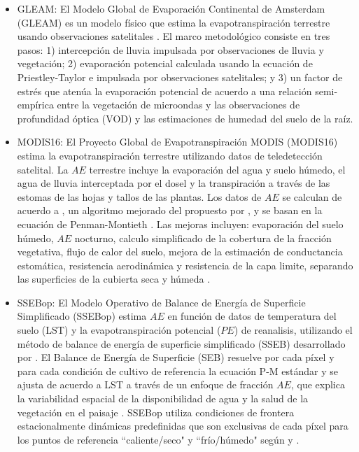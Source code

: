 \documentclass[12pt]{article}
\begin{document}
\begin{itemize}
	\item GLEAM: El Modelo Global de Evaporación Continental de Amsterdam (GLEAM) es un modelo físico que estima la evapotranspiración terrestre usando observaciones satelitales \citep{Martens2017}. El marco metodológico consiste en tres pasos: 1) intercepción de lluvia impulsada por observaciones de lluvia y vegetación; 2) evaporación potencial calculada usando la ecuación de Priestley-Taylor \citep[P-T;][]{priestley1972assessment} e impulsada por observaciones satelitales; y 3) un factor de estrés que atenúa la evaporación potencial de acuerdo a una relación semi-empírica entre la vegetación de microondas y las observaciones de profundidad óptica (VOD) y las estimaciones de humedad del suelo de la raíz. %
	
	\item MODIS16: El Proyecto Global de Evapotranspiración MODIS (MODIS16) estima la evapotranspiración terrestre utilizando datos de teledetección satelital. La $AE$ terrestre incluye la evaporación del agua y suelo húmedo, el agua de lluvia interceptada por el dosel y la transpiración a través de las estomas de las hojas y tallos de las plantas. Los datos de $AE$ se calculan de acuerdo a \citet{mu2013modis}, un algoritmo mejorado del propuesto por \citet{mu2007development}, y se basan en la ecuación de Penman-Montieth \citep[P-M;][]{monteith1965evaporation}. Las mejoras incluyen: evaporación del suelo húmedo, $AE$ nocturno, calculo simplificado de la cobertura de la fracción vegetativa, flujo de calor del suelo, mejora de la estimación de conductancia estomática, resistencia aerodinámica y resistencia de la capa limite, separando las superficies de la cubierta seca y húmeda \citep{mu2013modis}.
	
	\item SSEBop: El Modelo Operativo de Balance de Energía de Superficie Simplificado (SSEBop) estima $AE$ en función de datos de temperatura del suelo (LST) y la evapotranspiración potencial ($PE$) de reanalisis, utilizando el método de balance de energía de superficie simplificado (SSEB) desarrollado por \citet{senay2007coupled,senay2011enhancing}. El Balance de Energía de Superficie (SEB) resuelve por cada píxel y para cada condición de cultivo de referencia la ecuación P-M estándar y se ajusta de acuerdo a LST a través de un enfoque de fracción $AE$, que explica la variabilidad espacial de la disponibilidad de agua y la salud de la vegetación en el paisaje \citep{savoca2013actual}. SSEBop utiliza condiciones de frontera estacionalmente dinámicas predefinidas que son exclusivas de cada píxel para los puntos de referencia ``caliente/seco" y ``frío/húmedo" según \citet{bastiaanssen2014earth} y \citet{allen2007satellite}.
	

\end{itemize}
\end{document}
